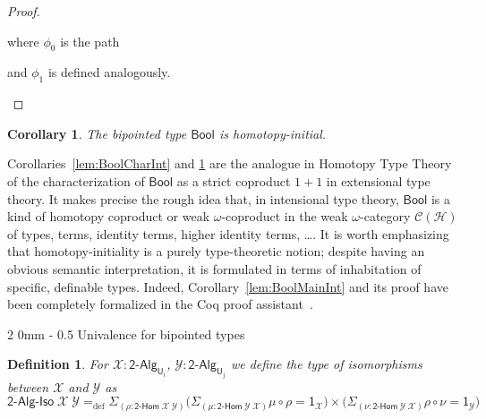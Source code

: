 \documentclass[reqno,10pt,a4paper,oneside]{amsart}
\makeatletter
\newcommand{\X}{\mathcal{X}}
\newcommand{\Y}{\mathcal{Y}}
\newcommand{\fst}{\mathsf{fst}}
\newcommand{\snd}{\mathsf{snd}}
\newcommand{\comp}{\circ}
\newcommand{\sm}[1]{\Sigma_{#1}}
\newcommand{\defeq}{=_{\mathrm{def}}}
\newcommand{\refl}{\mathsf{refl}}
\newcommand{\Bool}{\mathsf{Bool}}
\newcommand{\idtodpair}{\leftidx{^=}{\mathsf{Eq}}^{\Sigma}}
\newcommand{\one}{\mathsf{1}}
\newcommand{\UU}{\mathsf{U}}
\newcommand{\BoolAlg}{\mathsf{2}\text{-}\mathsf{Alg}}
\newcommand{\BoolHom}{\mathsf{2}\text{-}\mathsf{Hom}}
\newcommand{\trans}{\mathsf{tr}}
\newcommand{\BoolAlgIso}{\mathsf{2}\text{-}\mathsf{Alg}\text{-}\mathsf{Iso}}
\newcommand{\Hint}{\mathcal{H}}
\newcommand{\ct}{%
  \mathchoice{\mathbin{\raisebox{0.5ex}{$\displaystyle\centerdot$}}}%
             {\mathbin{\raisebox{0.5ex}{$\centerdot$}}}%
             {\mathbin{\raisebox{0.25ex}{$\scriptstyle\,\centerdot\,$}}}%
             {\mathbin{\raisebox{0.1ex}{$\scriptscriptstyle\,\centerdot\,$}}}}
\renewcommand{\subsection}{\@startsection
  {subsection}%
  {2}%
  {0mm}%
  {-\baselineskip}%
  {0.5\baselineskip}%
  {\normalfont\normalsize\bf}}%
\numberwithin{equation}{section}
\theoremstyle{mythm}
\newtheorem{corollary}[theorem]{Corollary}
\theoremstyle{mydef}
\newtheorem{definition}[theorem]{Definition}
\theoremstyle{myrmk}
\makeatother
\begin{document}
\begin{proof}
\begin{itemize}
where $\phi_0$ is the path
\begin{center}
\end{center}
and $\phi_1$ is defined analogously.
\end{itemize}
\end{proof}


\begin{corollary}\label{lem:BoolInitInt}
The bipointed type $\Bool$ is homotopy-initial.
\end{corollary}


Corollaries~\ref{lem:BoolCharInt} and \ref{lem:BoolInitInt} are the analogue in Homotopy Type Theory of the characterization of 
$\Bool$ as a strict coproduct $1+1$ in extensional type theory. It makes precise the rough idea that, 
in intensional type theory, $\Bool$ is a kind of homotopy coproduct or weak $\omega$-coproduct 
in the weak $\omega$-category $\mathcal{C}(\Hint)$ of types, terms, identity terms, higher identity terms, \ldots.  
It is worth emphasizing that homotopy-initiality is a purely type-theoretic notion; despite having an obvious semantic interpretation, it is formulated in terms of inhabitation of specific, definable types. Indeed, Corollary~\ref{lem:BoolMainInt} and its proof have been completely formalized in the Coq proof assistant~\cite{AwodeyS:indtht}.


\subsection{Univalence for bipointed types} 



\begin{definition}
For $\X : \BoolAlg_{\UU_i}$, $\Y : \BoolAlg_{\UU_j}$ we define the type of \emph{isomorphisms} between $\X$ and $\Y$ as
\[\BoolAlgIso \; \X \; \Y \defeq \sm{(\rho : \BoolHom \; \X \; \Y)} \Big( \sm{(\mu : \BoolHom \; \Y \; \X)} \mu \comp \rho = \one_\X \Big) \times \Big( \sm{(\nu : \BoolHom \; \Y \; \X)} \rho \comp \nu = \one_\Y \Big) \] 
\end{definition}
\end{document}
